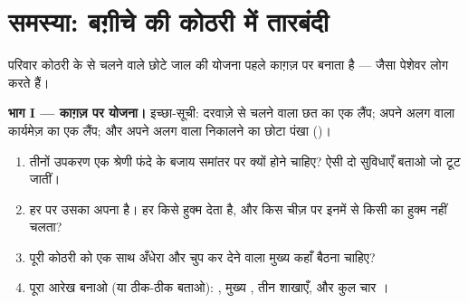 \section{समस्या: बग़ीचे की कोठरी में तारबंदी}

\begin{problem}\label{pb:g6:circuits-and-safety:1}
परिवार कोठरी के  से चलने वाले छोटे जाल की योजना पहले काग़ज़ पर
बनाता है --- जैसा पेशेवर लोग करते हैं।

\medskip\noindent\textbf{भाग I --- काग़ज़ पर योजना।}
इच्छा-सूची: दरवाज़े से चलने वाला छत का एक लैंप; अपने अलग  वाला
कार्यमेज़ का एक लैंप; और अपने अलग  वाला  निकालने का छोटा पंखा
()।
\begin{enumerate}
  \item तीनों उपकरण एक श्रेणी फंदे के बजाय समांतर  पर क्यों
        होने चाहिए? ऐसी दो सुविधाएँ बताओ जो  टूट जातीं।
  \item हर  पर उसका अपना  है। हर  किसे हुक्म देता है,
        और किस चीज़ पर इनमें से किसी का हुक्म नहीं चलता?
  \item पूरी कोठरी को एक साथ अँधेरा और चुप कर देने वाला मुख्य 
        कहाँ बैठना चाहिए?
  \item पूरा आरेख बनाओ (या ठीक-ठीक बताओ): , मुख्य , तीन
        शाखाएँ, और कुल चार ।
\end{enumerate}


\end{problem}
